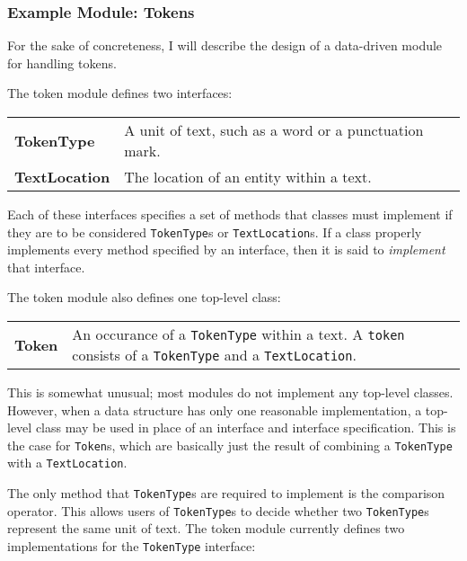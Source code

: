 \documentclass{article}
\begin{document}
\subsubsection{Example Module: Tokens}

For the sake of concreteness, I will describe the design of a
data-driven module for handling tokens.  

The token module defines two interfaces:

\vspace{1.2mm}\noindent
\begin{tabular}{||p{}p{}}
  \textbf{TokenType} & A unit of text, such as a word or a
  punctuation mark. \\

  \textbf{TextLocation} & The location of an entity within a
  text.\\
\end{tabular}
\vspace{1mm}

\noindent
Each of these interfaces specifies a set of methods that classes must
implement if they are to be considered \texttt{TokenType}s or
\texttt{TextLocation}s.  If a class properly implements every method specified
by an interface, then it is said to \emph{implement} that interface.

The token module also defines one top-level class:

\vspace{1.2mm}\noindent
\begin{tabular}{||p{}p{}}
  \textbf{Token} & An occurance of a \texttt{TokenType}
  within a text.  A \texttt{token} consists of a \texttt{TokenType}
  and a \texttt{TextLocation}. \\
\end{tabular}
\vspace{1mm}

\noindent
This is somewhat unusual; most modules do not implement any top-level
classes.  However, when a data structure has only one reasonable
implementation, a top-level class may be used in place of an interface 
and interface specification.  This is the case for \texttt{Token}s,
which are basically just the result of combining a \texttt{TokenType} 
with a \texttt{TextLocation}.

The only method that \texttt{TokenType}s are required to implement is
the comparison operator.  This allows users of \texttt{TokenType}s to
decide whether two \texttt{TokenType}s represent the same unit of
text.  The token module currently defines two implementations for the
\texttt{TokenType} interface:
\end{document}
